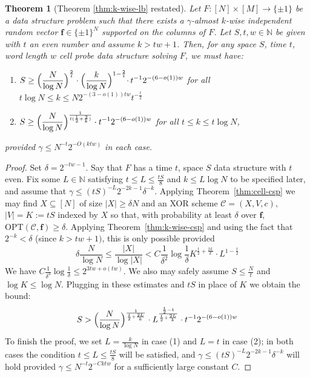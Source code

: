 \documentclass[11pt]{article}
\newtheorem{theorem}{Theorem}
\newtheorem*{theorem*}{Theorem}
\newcommand{\Opt}{\mathrm{OPT}}
\newcommand{\N}{[N]}
\begin{document}
\begin{theorem*} [Theorem \ref{thm:k-wise-lb} restated]
Let 
$F: [N] \times [M] \to \{\pm 1\}$ 
be a data structure problem such that there exists a  $\gamma$-almost $k$-wise independent random vector $\bm{f}\in \{\pm 1\}^N$ supported on the columns of $F$. Let $S,t,w \in \mathbb{N}$ be given with $t$ an even number and assume $k > tw + 1$. Then, for any space $S$, time $t$, word length $w$ cell probe data structure solving $F$, we must have:
\begin{enumerate}
    \item $\begin{aligned}[t]
    S \geq  \Bigl( \frac{N}{\log N}\Bigr)^{\frac{2}{t}} \cdot \Bigl(\frac{k}{\log N}\Bigl)^{1 - \frac{2}{t}}  \cdot\,t^{-1}2^{-(6-o(1))w }
  \end{aligned}$ for all $t\log N \leq k \leq N 2^{-(3-o(1))tw} t^{-\frac{t}{2}}$
  \item $\begin{aligned}[t]
    S \geq   \Bigl( \frac{N}{\log N}\Bigr)^{\frac{1}{t(\frac{1}{2} + \frac{2}{k})}} \cdot t^{-1}2^{-(6-o(1))w}
  \end{aligned}$ for all $t \leq k \leq t\log N$,
\end{enumerate}
 provided $\gamma \leq  N^{-t} 2^{-O(ktw)}$ in each case.
\end{theorem*}

\medskip 

\begin{proof}
Set $\delta = 2^{-tw-1}$.
Say that $F$ has a time $t$, space $S$ data structure with $t$ even. Fix some $L \in \mathbb{N}$ satisfying $t \leq L \leq \frac{tS}{8}$ and $k \leq L \log N$ to be specified later, and assume that $\gamma \leq (tS)^{-L} 2^{-2k-1} \delta^{-k}$. Applying Theorem~\ref{thm:cell-csp} we may find $X \subseteq \N$ of size $|X| \geq \delta N$ and an XOR scheme $\mathcal{C}= (X,V,c)$, $|V|=K:=tS$ indexed by $X$ so that, with probability at least $\delta$ over $\bm{f}$, $\Opt(\mathcal{C},\bm{f}) \geq \delta$. Applying Theorem~\ref{thm:k-wise-csp} and using the fact that $2^{-k} < \delta$ (since $k > tw + 1)$, this is only possible provided
\[
\delta \frac{N}{\log N} \leq \frac{|X|}{\log |X|} <  C \frac{1}{\delta^2} \log \frac{1}{\delta} K^{\frac{t}{2} + \frac{2L}{k}} \cdot  L^{1 - \frac{t}{2}}
\]
We have $ C \frac{1}{\delta^3} \log \frac{1}{\delta}\leq 2^{3tw + o(tw)}$. We also may safely assume $S \leq \frac{N}{t}$ and $\log K \leq \log N$. Plugging in these estimates and $tS$ in place of $K$ we obtain the bound:
\begin{gather}
S > \Bigl(\frac{N}{\log N}\Bigr)^{\frac{1}{\frac{t}{2} + \frac{2L}{k}}} \cdot L^{\frac{\frac{t}{2}-1}{\frac{t}{2} + \frac{2L}{k}}} \cdot t^{-1}2^{-(6 - o(1))w}
\end{gather}
To finish the proof, we set $L = \frac{k}{\log N}$ in case (1) and $L = t$ in case (2); in both cases the condition $t \leq L \leq \frac{tS}{8}$ will be satisfied, and $\gamma \leq (tS)^{-L} 2^{-2k-1} \delta^{-k}$ will hold provided $\gamma \leq N^{-t} 2^{-C ktw}$ for a sufficiently large constant $C$.

\end{proof}
\end{document}
